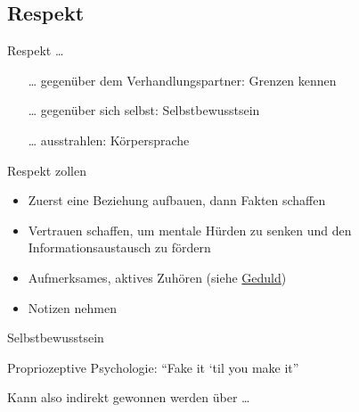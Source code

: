 \subsection{Respekt}

\begin{frame}{Respekt \ldots}

  \begin{itemize}
    \item[\ldots] gegenüber dem Verhandlungspartner: Grenzen kennen
    \item[\ldots] gegenüber sich selbst: Selbstbewusstsein
    \item[\ldots] ausstrahlen: Körpersprache
  \end{itemize}

\end{frame}

\begin{frame}{Respekt zollen}

  \begin{itemize}
    \item Zuerst eine Beziehung aufbauen, dann Fakten schaffen \cite[][p. 16]{mccarthy_advanced_2015}
    \item Vertrauen schaffen, um mentale Hürden zu senken und den Informationsaustausch zu fördern 
    \item Aufmerksames, aktives Zuhören (siehe \hyperref[sec:geduld]{Geduld})
    \item Notizen nehmen 
  \end{itemize}

\end{frame}

\begin{frame}{Selbstbewusstsein}

  Propriozeptive Psychologie: \enquote{Fake it `til you make it} \cite[][p. 38]{mccarthy_advanced_2015}


  Kann also indirekt gewonnen werden über \ldots 

\end{frame}

